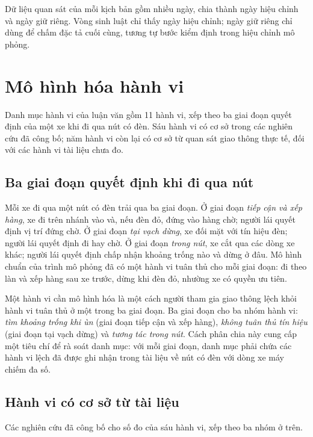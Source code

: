 \documentclass[../main.tex]{subfiles}
\begin{document}
Dữ liệu quan sát của mỗi kịch bản gồm nhiều ngày, chia thành ngày hiệu chỉnh và ngày giữ riêng. Vòng sinh luật chỉ thấy ngày hiệu chỉnh; ngày giữ riêng chỉ dùng để chấm đặc tả cuối cùng, tương tự bước kiểm định trong hiệu chỉnh mô phỏng.

\section{Mô hình hóa hành vi}
\label{section:rg_behaviours}

Danh mục hành vi của luận văn gồm 11 hành vi, xếp theo ba giai đoạn quyết định của một xe khi đi qua nút có đèn. Sáu hành vi có cơ sở trong các nghiên cứu đã công bố; năm hành vi còn lại có cơ sở từ quan sát giao thông thực tế, đối với các hành vi tài liệu chưa đo.

\subsection{Ba giai đoạn quyết định khi đi qua nút}

Mỗi xe đi qua một nút có đèn trải qua ba giai đoạn. Ở giai đoạn \emph{tiếp cận và xếp hàng}, xe đi trên nhánh vào và, nếu đèn đỏ, đứng vào hàng chờ; người lái quyết định vị trí đứng chờ. Ở giai đoạn \emph{tại vạch dừng}, xe đối mặt với tín hiệu đèn; người lái quyết định đi hay chờ. Ở giai đoạn \emph{trong nút}, xe cắt qua các dòng xe khác; người lái quyết định chấp nhận khoảng trống nào và dừng ở đâu. Mô hình chuẩn của trình mô phỏng đã có một hành vi tuân thủ cho mỗi giai đoạn: đi theo làn và xếp hàng sau xe trước, dừng khi đèn đỏ, nhường xe có quyền ưu tiên.

Một hành vi cần mô hình hóa là một cách người tham gia giao thông lệch khỏi hành vi tuân thủ ở một trong ba giai đoạn. Ba giai đoạn cho ba nhóm hành vi: \emph{tìm khoảng trống khi ùn} (giai đoạn tiếp cận và xếp hàng), \emph{không tuân thủ tín hiệu} (giai đoạn tại vạch dừng) và \emph{tương tác trong nút}. Cách phân chia này cung cấp một tiêu chí để rà soát danh mục: với mỗi giai đoạn, danh mục phải chứa các hành vi lệch đã được ghi nhận trong tài liệu về nút có đèn với dòng xe máy chiếm đa số.

\subsection{Hành vi có cơ sở từ tài liệu}

Các nghiên cứu đã công bố cho số đo của sáu hành vi, xếp theo ba nhóm ở trên.
\end{document}
